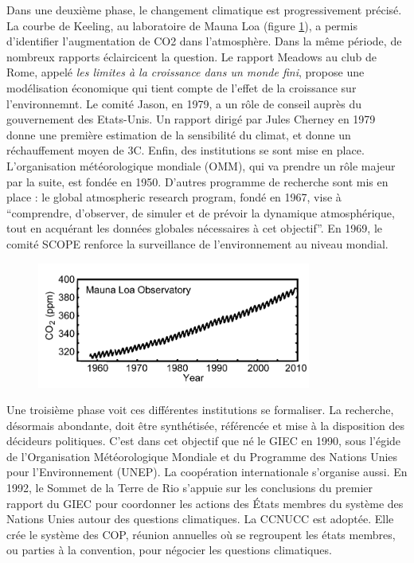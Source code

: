 Dans une deuxième phase, le changement climatique est progressivement précisé. La courbe de Keeling, au laboratoire de Mauna Loa (figure \ref{fig:keeling}), a permis d'identifier l'augmentation de CO2 dans l'atmosphère. Dans la même période, de nombreux rapports éclaircicent la question. Le rapport Meadows au club de Rome, appelé \emph{les limites à la croissance dans un monde fini}, propose une modélisation économique qui tient compte de l'effet de la croissance sur l'environnemnt. Le comité Jason, en 1979, a un rôle de conseil auprès du gouvernement des Etats-Unis. Un rapport dirigé par Jules Cherney en 1979 donne une première estimation de la sensibilité du climat, et donne un réchauffement moyen de 3\textdegree C. Enfin, des institutions se sont mise en place. L'organisation météorologique mondiale (OMM), qui va prendre un rôle majeur par la suite, est fondée en 1950. D'autres programme de recherche sont mis en place : le global atmospheric research program, fondé en 1967, vise à \enquote{comprendre, d’observer, de simuler et de prévoir la dynamique atmosphérique, tout en acquérant les données globales nécessaires à cet objectif}. En 1969, le comité SCOPE renforce la surveillance de l'environnement au niveau mondial. 

\begin{figure}
    \centering

    \includegraphics[width=0.5\linewidth]{figures/keeling.png}

    \label{fig:keeling}
\end{figure}

Une troisième phase voit ces différentes institutions se formaliser. La recherche, désormais abondante, doit être synthétisée, référencée et mise à la disposition des décideurs politiques. C'est dans cet objectif que né le \Gls{GIEC} en 1990, sous l'égide de l'Organisation Météorologique Mondiale et du Programme des Nations Unies pour l'Environnement (UNEP). La coopération internationale s'organise aussi. En 1992, le Sommet de la Terre de Rio s'appuie sur les conclusions du premier rapport du \Gls{GIEC} pour coordonner les actions des États membres du système des Nations Unies autour des questions climatiques. La \Gls{CCNUCC} est adoptée. Elle crée le système des \Gls{COP}, réunion annuelles où se regroupent les états membres, ou parties à la convention, pour négocier les questions climatiques.



